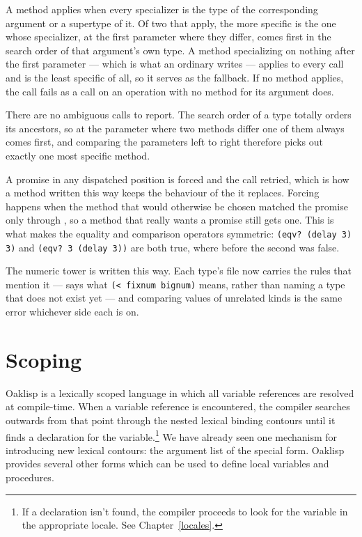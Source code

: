 A method applies when every specializer is the type of the
corresponding argument or a supertype of it.  Of two that apply, the
more specific is the one whose specializer, at the first parameter
where they differ, comes first in the search order of that argument's
own type.  A method specializing on nothing after the first
parameter --- which is what an ordinary  writes ---
applies to every call and is the least specific of all, so it serves
as the fallback.  If no method applies, the call fails as a call on an
operation with no method for its argument does.

There are no ambiguous calls to report.  The search order of a type
totally orders its ancestors, so at the parameter where two methods
differ one of them always comes first, and comparing the parameters
left to right therefore picks out exactly one most specific method.

A promise in any dispatched position is forced and the call retried,
which is how a method written this way keeps the behaviour of the
 it replaces.  Forcing happens when the method that
would otherwise be chosen matched the promise only through
, so a method that really wants a promise still gets one.
This is what makes the equality and comparison operators symmetric:
\texttt{(eqv? (delay 3) 3)} and \texttt{(eqv? 3 (delay 3))} are both
true, where before the second was false.

The numeric tower is written this way.  Each type's file now carries
the rules that mention it ---  says what \texttt{(< fixnum
bignum)} means, rather than  naming a type that does
not exist yet --- and comparing values of unrelated kinds is the same
error whichever side each is on.


\section{Scoping}

Oaklisp is a lexically scoped language in which all variable
references are resolved at compile-time.  When a variable reference is
encountered, the compiler searches outwards from that point through
the nested lexical binding contours until it finds a declaration for
the variable.\footnote{If a declaration isn't found, the compiler
proceeds to look for the variable in the appropriate locale. See
Chapter~\ref{locales}.} We have already seen one mechanism for
introducing new lexical contours: the argument list of the
 special form.  Oaklisp provides several other forms
which can be used to define local variables and procedures.

